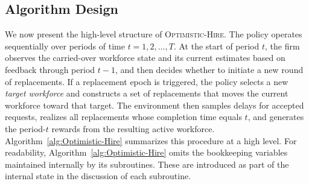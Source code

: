 \documentclass[opre,blindrev]{informs3}
\begin{document}
\vspace{-.1in}

\subsection{Algorithm Design}

We now present the high-level structure of \textsc{Optimistic-Hire}. The policy operates sequentially over periods of time \(t=1,2,\dots,T\). At the start of period \(t\), the firm observes the carried-over workforce state and its current estimates based on feedback through period \(t-1\), and then decides whether to initiate a new round of replacements. If a replacement epoch is triggered, the policy selects a new \emph{target workforce} and constructs a set of replacements that moves the current workforce toward that target. The environment then samples delays for accepted requests, realizes all replacements whose completion time equals \(t\), and generates the period-\(t\) rewards from the resulting active workforce. Algorithm~\ref{alg:Optimistic-Hire} summarizes this procedure at a high level. For readability, Algorithm~\ref{alg:Optimistic-Hire} omits the bookkeeping variables maintained internally by its subroutines. These are introduced as part of the internal state in the discussion of each subroutine.
\end{document}
